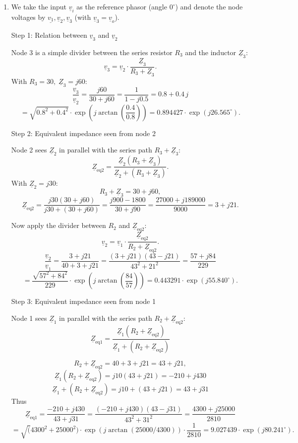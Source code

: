 \documentclass[11pt,a4paper]{article}
\newif\ifshowsolutions
\newenvironment{solution}
  {\ifshowsolutions
     \begin{tcolorbox}[enhanced, breakable, width=\textwidth,
       colback=green!5!white,colframe=green!50!black,
       fonttitle=\bfseries\large,
       title=Solution]}
  {\end{tcolorbox}\fi}
\begin{document}
\ifshowsolutions
\begin{solution}
\begin{enumerate}[label=\alph*)]
\item We take the input \(\underline{v}_i\) as the reference phasor (angle \(0^\circ\)) and denote the node voltages by \(\underline{v_1}, \underline{v}_2, \underline{v}_3\) (with \(\underline{v}_3 = \underline{v}_o\)).

Step 1: Relation between $\underline{v}_3$ and $\underline{v}_2$

Node 3 is a simple divider between the series resistor \(R_3\) and the inductor \(\underline{Z}_3\):
\[
\underline{v}_3 = \underline{v}_2 \cdot \frac{\underline{Z}_3}{R_3 + \underline{Z}_3}.
\]
With \(R_3 = 30,\; \underline{Z}_3 = j60\):
\[
\frac{\underline{v}_3}{\underline{v}_2} = \frac{j60}{30 + j60} = \frac{1}{1 - j 0.5} = 0.8 + 0.4\,j
\]
\[
= \sqrt{0.8^2 + 0.4^2} \cdot \exp\!\left(j \arctan\!\left(\frac{0.4}{0.8}\right)\right) = 0.894427 \cdot \exp(j 26.565^\circ).
\]

Step 2: Equivalent impedance seen from node 2

Node 2 sees \(\underline{Z}_2\) in parallel with the series path \(R_3 + \underline{Z}_3\):
\[
\underline{Z}_{\text{eq2}} = \frac{\underline{Z}_2 (R_3 + \underline{Z}_3)}{\underline{Z}_2 + (R_3 + \underline{Z}_3)}.
\]
With \(\underline{Z}_2 = j30\):
\[
R_3 + \underline{Z}_3 = 30 + j60,
\]
\[
\underline{Z}_{\text{eq2}} = \frac{j30 (30 + j60)}{j30 + (30 + j60)} = \frac{j900 - 1800}{30 + j90} = \frac{27000 + j189000}{9000} = 3 + j21.
\]

Now apply the divider between \(R_2\) and \(\underline{Z}_{\text{eq2}}\):
\[
\underline{v}_2 = \underline{v}_1 \cdot \frac{\underline{Z}_{\text{eq2}}}{R_2 + \underline{Z}_{\text{eq2}}}.
\]
\[
\frac{\underline{v}_2}{\underline{v}_1} = \frac{3 + j21}{40 + 3 + j21} = \frac{(3 + j21) (43 - j21)}{43^2 + 21^2} = \frac{57 + j84}{229}
\]
\[
= \frac{\sqrt{57^2 + 84^2}}{229} \cdot \exp\!\left(j \arctan\!\left(\frac{84}{57}\right)\right) = 0.443291 \cdot \exp\!\left(j 55.840^\circ\right).
\]

Step 3: Equivalent impedance seen from node 1

Node 1 sees \(\underline{Z}_1\) in parallel with the series path \(R_2 + \underline{Z}_{\text{eq2}}\):
\[
\underline{Z}_{\text{eq1}} = \frac{\underline{Z}_1 (R_2 + \underline{Z}_{\text{eq2}})}{\underline{Z}_1 + (R_2 + \underline{Z}_{\text{eq2}})}
\]

\[
R_2 + \underline{Z}_{\text{eq2}} = 40 + 3 + j21 = 43 + j21,
\]
\[
\underline{Z}_1 (R_2 + \underline{Z}_{\text{eq2}}) = j10 (43 + j21) = -210 + j430
\]
\[
\underline{Z}_1 + (R_2 + \underline{Z}_{\text{eq2}}) = j10 + (43 + j21) = 43 + j31
\]
Thus
\[
\underline{Z}_{\text{eq1}} = \frac{-210 + j430}{43 + j31} = \frac{(-210 + j430)(43 - j31)}{43^2 + 31^2} = \frac{4300 + j25000}{2810}
\]
\[
= \sqrt(4300^2 + 25000^2) \cdot \exp\!\left(j \arctan\!\left(25000/4300\right)\right) \cdot \frac{1}{2810} = 9.027439 \cdot \exp\!\left(j 80.241^\circ\right).
\]


\end{enumerate}
\end{solution}
\end{document}
